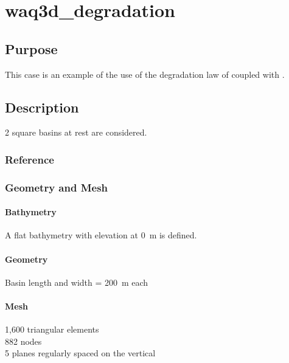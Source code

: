 \chapter{waq3d\_degradation}
%
%
\section{Purpose}
%
This case is an example of the use of the degradation law of \waqtel coupled with .
%
\section{Description}
%
2 square basins at rest are considered.
%
%
%
%
\subsection{Reference}
%

%
%
%
\subsection{Geometry and Mesh}
%
\subsubsection{Bathymetry}
%
A flat bathymetry with elevation at 0~m is defined.
%
\subsubsection{Geometry}
%
Basin length and width = 200~m each
%
\subsubsection{Mesh}
%
1,600 triangular elements\\
882 nodes\\
5 planes regularly spaced on the vertical
%
%
%
